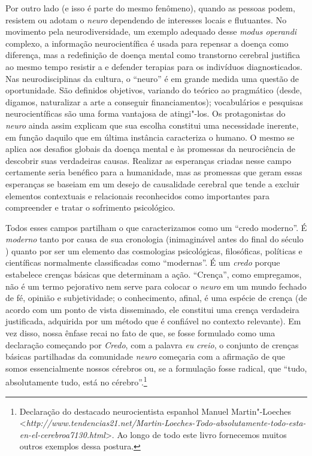 Por outro lado (e isso é parte do mesmo fenômeno), quando as pessoas
podem, resistem ou adotam o \emph{neuro} dependendo de interesses locais
e flutuantes. No movimento pela neurodiversidade, um exemplo adequado
desse \emph{modus operandi} complexo, a informação neurocientífica é
usada para repensar a doença como diferença, mas a redefinição de doença
mental como transtorno cerebral justifica ao mesmo tempo resistir a e
defender terapias para os indivíduos diagnosticados. Nas
neurodisciplinas da cultura, o ``neuro'' é em grande medida uma questão
de oportunidade. São definidos objetivos, variando do teórico ao
pragmático (desde, digamos, naturalizar a arte a conseguir
financiamentos); vocabulários e pesquisas neurocientíficas são uma forma
vantajosa de atingi"-los. Os protagonistas do \emph{neuro} ainda assim
explicam que sua escolha constitui uma necessidade inerente, em função
daquilo que em última instância caracteriza o humano. O mesmo se aplica
aos desafios globais da doença mental e às promessas da neurociência de
descobrir suas verdadeiras causas. Realizar as esperanças criadas nesse
campo certamente seria benéfico para a humanidade, mas as promessas que
geram essas esperanças se baseiam em um desejo de causalidade cerebral
que tende a excluir elementos contextuais e relacionais reconhecidos
como importantes para compreender e tratar o sofrimento psicológico.

Todos esses campos partilham o que caracterizamos como um ``credo
moderno''. É \emph{moderno} tanto por causa de sua cronologia
(inimaginável antes do final do século ) quanto por ser um elemento
das cosmologias psicológicas, filosóficas, políticas e científicas
normalmente classificadas como ``modernas''. É um \emph{credo} porque
estabelece crenças básicas que determinam a ação. ``Crença'', como
empregamos, não é um termo pejorativo nem serve para colocar o
\emph{neuro} em um mundo fechado de fé, opinião e subjetividade; o
conhecimento, afinal, é uma espécie de crença (de acordo com um ponto de
vista disseminado, ele constitui uma crença verdadeira justificada,
adquirida por um método que é confiável no contexto relevante). Em vez
disso, nossa ênfase recai no fato de que, se fosse formulado como uma
declaração começando por \emph{Credo}, com a palavra \emph{eu
creio}, o conjunto de crenças básicas partilhadas da comunidade
\emph{neuro} começaria com a afirmação de que somos essencialmente
nossos cérebros ou, se a formulação fosse radical, que ``tudo,
absolutamente tudo, está no cérebro''.\footnote[2]{Declaração do destacado neurocientista espanhol Manuel
Martin"-Loeches
\textless{}\emph{http://www.tendencias21.net/Martin-Loeches-Todo-absolutamente-todo-esta-en-el-cerebroa7130.html}\textgreater{}.
Ao longo de todo este livro fornecemos muitos outros exemplos dessa
postura.}

